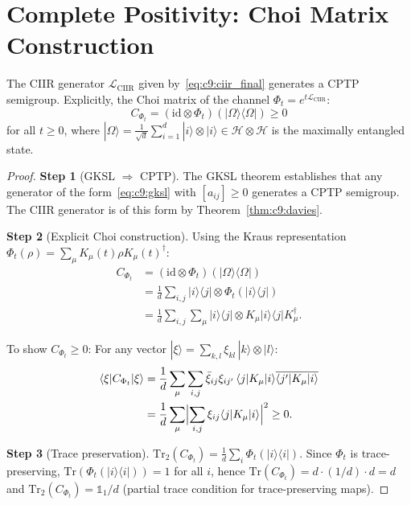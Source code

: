 \section{Complete Positivity: Choi Matrix Construction}
\label{sec:c9:cp}

\begin{theorem}
\label{thm:c9:choi}
The CIIR generator $\mathcal{L}_{\mathrm{CIIR}}$ given
by~\eqref{eq:c9:ciir_final} generates a CPTP semigroup.  Explicitly, the
Choi matrix of the channel $\Phi_t = e^{t\mathcal{L}_{\mathrm{CIIR}}}$:
\begin{equation}
  C_{\Phi_t} = (\mathrm{id} \otimes \Phi_t)(|\Omega\rangle\langle\Omega|)
  \geq 0
  \label{eq:c9:choi}
\end{equation}
for all $t \geq 0$, where $|\Omega\rangle = \frac{1}{\sqrt{d}}
\sum_{i=1}^{d} |i\rangle \otimes |i\rangle \in \mathcal{H} \otimes
\mathcal{H}$ is the maximally entangled state.
\end{theorem}

\begin{proof}
\textbf{Step 1} (GKSL $\Rightarrow$ CPTP).  The GKSL theorem
\cite{Lindblad1976, GKS1976} establishes that any generator of the
form~\eqref{eq:c9:gksl} with $[a_{ij}] \geq 0$ generates a CPTP
semigroup.  The CIIR generator is of this form by
Theorem~\ref{thm:c9:davies}.

\textbf{Step 2} (Explicit Choi construction).  Using the Kraus
representation $\Phi_t(\rho) = \sum_\mu K_\mu(t) \rho K_\mu(t)^\dagger$:
\begin{align}
  C_{\Phi_t}
  &= (\mathrm{id} \otimes \Phi_t)(|\Omega\rangle\langle\Omega|)
  \nonumber\\
  &= \frac{1}{d} \sum_{i,j} |i\rangle\langle j| \otimes
    \Phi_t(|i\rangle\langle j|)
  \nonumber\\
  &= \frac{1}{d} \sum_{i,j} \sum_\mu
    |i\rangle\langle j| \otimes K_\mu |i\rangle\langle j| K_\mu^\dagger.
  \label{eq:c9:choi_explicit}
\end{align}

To show $C_{\Phi_t} \geq 0$:  For any vector
$|\xi\rangle = \sum_{k,l} \xi_{kl}\, |k\rangle \otimes |l\rangle$:
\begin{align}
  \langle\xi| C_{\Phi_t} |\xi\rangle
  &= \frac{1}{d} \sum_\mu \sum_{i,j}
    \bar{\xi}_{ij} \xi_{ij'}\,
    \langle j|K_\mu|i\rangle \overline{\langle j'|K_\mu|i\rangle}
  \nonumber\\
  &= \frac{1}{d} \sum_\mu
    \Bigl| \sum_{i,j} \xi_{ij} \langle j|K_\mu|i\rangle \Bigr|^2
  \geq 0.
\end{align}

\textbf{Step 3} (Trace preservation).
$\mathrm{Tr}_2(C_{\Phi_t}) = \frac{1}{d} \sum_i \Phi_t(|i\rangle\langle i|)$.
Since $\Phi_t$ is trace-preserving,
$\mathrm{Tr}(\Phi_t(|i\rangle\langle i|)) = 1$ for all $i$, hence
$\mathrm{Tr}(C_{\Phi_t}) = d \cdot (1/d) \cdot d = d$
and $\mathrm{Tr}_2(C_{\Phi_t}) = \mathbb{1}_1/d$ (partial trace
condition for trace-preserving maps).
\end{proof}


